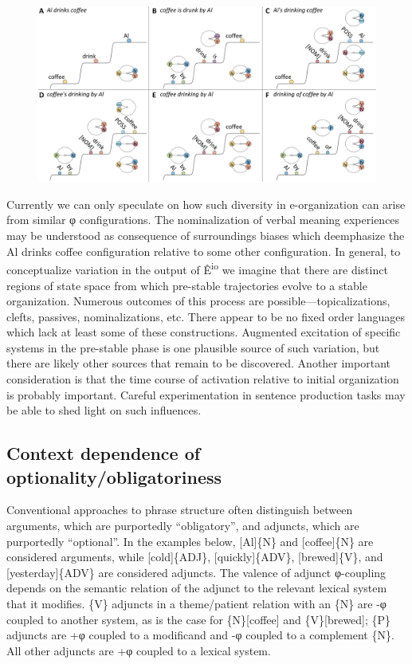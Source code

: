   
\begin{figure}
\includegraphics[width=\textwidth]{figures/Tilsen-img82.png}
\caption{\missingcaption}
\label{fig:4:32}
\end{figure}
 

  Currently we can only speculate on how such diversity in e-organization can arise from similar φ configurations. The nominalization of verbal meaning experiences may be understood as consequence of surroundings biases which deemphasize the {\textbar}Al drinks coffee{\textbar} configuration relative to some other configuration. In general, to conceptualize variation in the output of Ê\textsuperscript{io} we imagine that there are distinct regions of state space from which pre-stable trajectories evolve to a stable organization. Numerous outcomes of this process are possible—topicalizations, clefts, passives, nominalizations, etc. There appear to be no fixed order languages which lack at least some of these constructions. Augmented excitation of specific systems in the pre-stable phase is one plausible source of such variation, but there are likely other sources that remain to be discovered. Another important consideration is that the time course of activation relative to initial organization is probably important. Careful experimentation in sentence production tasks may be able to shed light on such influences.

\subsection{Context dependence of optionality/obligatoriness}

Conventional approaches to phrase structure often distinguish between arguments, which are purportedly “obligatory”, and adjuncts, which are purportedly “optional”. In the examples below, [Al]\{N\} and [coffee]\{N\} are considered arguments, while [cold]\{ADJ\}, [quickly]\{ADV\}, [brewed]\{V\}, and [yesterday]\{ADV\} are considered adjuncts. The valence of adjunct φ-coupling depends on the semantic relation of the adjunct to the relevant lexical system that it modifies. \{V\} adjuncts in a theme/patient relation with an \{N\} are -φ coupled to another system, as is the case for \{N\}[coffee] and \{V\}[brewed]; \{P\} adjuncts are +φ coupled to a modificand and -φ coupled to a complement \{N\}. All other adjuncts are +φ coupled to a lexical system.

